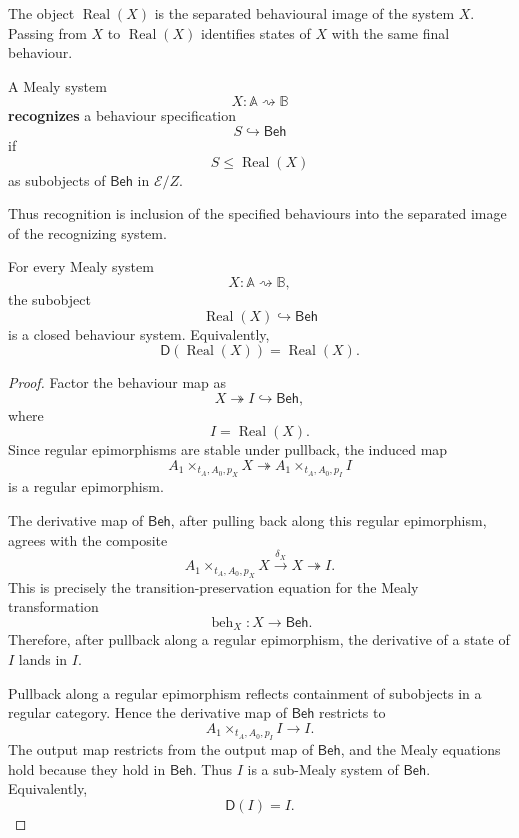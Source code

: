 The object \(\operatorname{Real}(X)\) is the separated behavioural image of
the system \(X\). Passing from \(X\) to \(\operatorname{Real}(X)\) identifies
states of \(X\) with the same final behaviour.

\begin{definition}
\label{def:state-eilenberg-recognition}
A Mealy system
\[
X:\mathbb A\rightsquigarrow\mathbb B
\]
\textbf{recognizes} a behaviour specification
\[
S\hookrightarrow\mathsf{Beh}
\]
if
\[
S\leq\operatorname{Real}(X)
\]
as subobjects of \(\mathsf{Beh}\) in \(\mathcal E/Z\).
\end{definition}

Thus recognition is inclusion of the specified behaviours into the separated
image of the recognizing system.

\begin{proposition}
\label{prop:state-eilenberg-realized-behaviours-closed}
For every Mealy system
\[
X:\mathbb A\rightsquigarrow\mathbb B,
\]
the subobject
\[
\operatorname{Real}(X)\hookrightarrow\mathsf{Beh}
\]
is a closed behaviour system. Equivalently,
\[
\mathsf D(\operatorname{Real}(X))
=
\operatorname{Real}(X).
\]
\end{proposition}

\begin{proof}
Factor the behaviour map as
\[
X\twoheadrightarrow I\hookrightarrow\mathsf{Beh},
\]
where
\[
I=\operatorname{Real}(X).
\]
Since regular epimorphisms are stable under pullback, the induced map
\[
A_1\times_{t_A,A_0,p_X}X
\twoheadrightarrow
A_1\times_{t_A,A_0,p_I}I
\]
is a regular epimorphism.

The derivative map of \(\mathsf{Beh}\), after pulling back along this regular
epimorphism, agrees with the composite
\[
A_1\times_{t_A,A_0,p_X}X
\xrightarrow{\delta_X}
X
\twoheadrightarrow
I.
\]
This is precisely the transition-preservation equation for the Mealy
transformation
\[
\operatorname{beh}_X:X\to\mathsf{Beh}.
\]
Therefore, after pullback along a regular epimorphism, the derivative of a
state of \(I\) lands in \(I\).

Pullback along a regular epimorphism reflects containment of subobjects in a
regular category. Hence the derivative map of \(\mathsf{Beh}\) restricts to
\[
A_1\times_{t_A,A_0,p_I}I\to I.
\]
The output map restricts from the output map of \(\mathsf{Beh}\), and the
Mealy equations hold because they hold in \(\mathsf{Beh}\). Thus \(I\) is a
sub-Mealy system of \(\mathsf{Beh}\). Equivalently,
\[
\mathsf D(I)=I.
\]
\end{proof}

